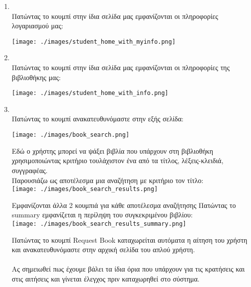 \documentclass[14pt]{report}
\begin{document}
	\begin{enumerate}[label=(\arabic*)]
		\newpage
		\hypertarget{s-show-my-info}{}
		\item {} \\
		Πατώντας το κουμπί στην ίδια σελίδα μας εμφανίζονται οι πληροφορίες λογαριασμού μας: \\
		\begin{center}
			\texttt{[image: ./images/student\_home\_with\_myinfo.png]}
		\end{center}
		\newpage
		\hypertarget{s-show-my-library}{}
		\item {} \\
		 Πατώντας το κουμπί στην ίδια σελίδα μας εμφανίζονται οι πληροφορίες της βιβλιοθήκης μας: \\
		 \begin{center}
		 	\texttt{[image: ./images/student\_home\_with\_info.png]}
		 \end{center}
	 	\newpage
	 	\hypertarget{s-books}{}
	 	\item {} \\
	 	Πατώντας το κουμπί ανακατευθυνόμαστε στην εξής σελίδα: \\
	 	\begin{center}
	 		\texttt{[image: ./images/book\_search.png]}
	 	\end{center}
 		Εδώ ο χρήστης μπορεί να ψάξει βιβλία που υπάρχουν στη βιβλιοθήκη χρησιμοποιώντας κριτήριο τουλάχιστον ένα από τα τίτλος, λέξεις-κλειδιά, συγγραφέας.\\
 		\newpage
 		Παρουσιάζω ως αποτέλεσμα μια αναζήτηση με κριτήριο τον τίτλο: \\
 		\texttt{[image: ./images/book\_search\_results.png]} 
 		
 		\vspace{\baselineskip}
 		Εμφανίζονται άλλα 2 κουμπιά για κάθε αποτέλεσμα αναζήτησης
 		\newpage
 		Πατώντας το summary εμφανίζεται η περίληψη του συγκεκριμένου βιβλίου: \\
 		\texttt{[image: ./images/book\_search\_results\_summary.png]}
 		
 		\vspace{\baselineskip}
 		Πατώντας το κουμπί Request Book καταχωρείται αυτόματα η αίτηση του χρήστη και ανακατευθυνόμαστε στην αρχική σελίδα του απλού χρήστη. \\ \\
 		Ας σημειωθεί πως έχουμε βάλει τα ίδια όρια που υπάρχουν για τις κρατήσεις και στις αιτήσεις και γίνεται έλεγχος πριν καταχωρηθεί στο σύστημα. 
 		

\end{enumerate}
\end{document}
